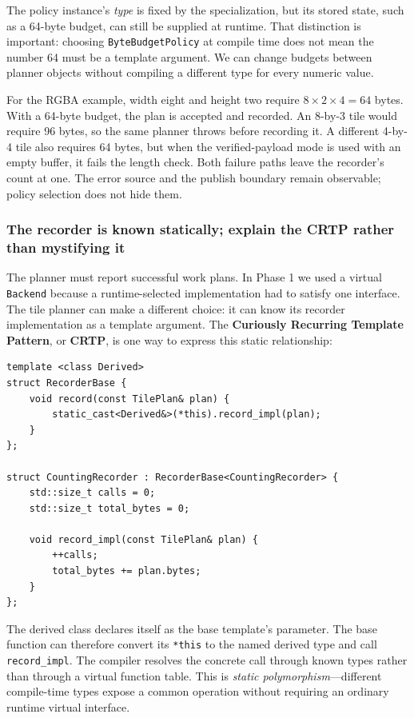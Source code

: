The policy instance's \emph{type} is fixed by the specialization, but its stored state, such as a 64-byte budget, can still be supplied at runtime. That distinction is important: choosing \texttt{ByteBudgetPolicy} at compile time does not mean the number 64 must be a template argument. We can change budgets between planner objects without compiling a different type for every numeric value.

For the RGBA example, width eight and height two require \(8\times2\times4=64\) bytes. With a 64-byte budget, the plan is accepted and recorded. An 8-by-3 tile would require 96 bytes, so the same planner throws before recording it. A different 4-by-4 tile also requires 64 bytes, but when the verified-payload mode is used with an empty buffer, it fails the length check. Both failure paths leave the recorder's count at one. The error source and the publish boundary remain observable; policy selection does not hide them.

\subsubsection{The recorder is known statically; explain the CRTP rather than mystifying it}\label{the-recorder-is-known-statically-explain-the-crtp-rather-than-mystifying-it}

The planner must report successful work plans. In Phase 1 we used a virtual \texttt{Backend} because a runtime-selected implementation had to satisfy one interface. The tile planner can make a different choice: it can know its recorder implementation as a template argument. The \textbf{Curiously Recurring Template Pattern}, or \textbf{CRTP}, is one way to express this static relationship:

\begin{verbatim}
template <class Derived>
struct RecorderBase {
    void record(const TilePlan& plan) {
        static_cast<Derived&>(*this).record_impl(plan);
    }
};

struct CountingRecorder : RecorderBase<CountingRecorder> {
    std::size_t calls = 0;
    std::size_t total_bytes = 0;

    void record_impl(const TilePlan& plan) {
        ++calls;
        total_bytes += plan.bytes;
    }
};
\end{verbatim}

The derived class declares itself as the base template's parameter. The base function can therefore convert its \texttt{*this} to the named derived type and call \texttt{record\_impl}. The compiler resolves the concrete call through known types rather than through a virtual function table. This is \emph{static polymorphism}---different compile-time types expose a common operation without requiring an ordinary runtime virtual interface.

